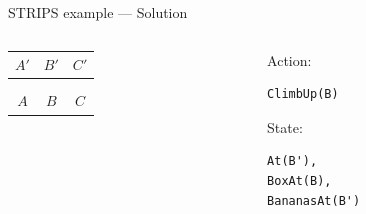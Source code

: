\begin{frame}[fragile]{STRIPS example --- Solution}
	\begin{columns}
		\begin{column}{0.4\textwidth}
	\begin{center}
			\begin{tabular}{c|c|c}
				  $A'$  &   $B'$  &   $C'$  \\\hline
				\emptyy & \banana\monkey & \emptyy \\
				\emptyy & \boxbox & \emptyy \\\hline
				  $A$   &   $B$   &    $C$
			\end{tabular}
	\end{center}
		\end{column}
		\begin{column}{0.58\textwidth}
			Action:
			\begin{lstlisting}
ClimbUp(B)
			\end{lstlisting}
			State:
			\begin{lstlisting}
At(B'),
BoxAt(B),
BananasAt(B')
			\end{lstlisting}
		\end{column}
	\end{columns}
\end{frame}

